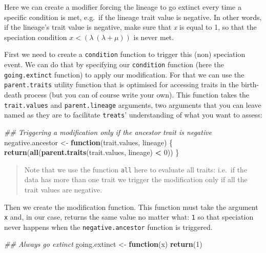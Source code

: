 \documentclass[
]{book}
\newenvironment{Shaded}{\begin{snugshade}}{\end{snugshade}}
\newcommand{\CommentTok}[1]{\textcolor[rgb]{0.56,0.35,0.01}{\textit{#1}}}
\newcommand{\ControlFlowTok}[1]{\textcolor[rgb]{0.13,0.29,0.53}{\textbf{#1}}}
\newcommand{\DecValTok}[1]{\textcolor[rgb]{0.00,0.00,0.81}{#1}}
\newcommand{\KeywordTok}[1]{\textcolor[rgb]{0.13,0.29,0.53}{\textbf{#1}}}
\newcommand{\NormalTok}[1]{#1}
\newcommand{\OperatorTok}[1]{\textcolor[rgb]{0.81,0.36,0.00}{\textbf{#1}}}
\newcommand{\StringTok}[1]{\textcolor[rgb]{0.31,0.60,0.02}{#1}}
\begin{document}
Here we can create a modifier forcing the lineage to go extinct every time a specific condition is met, e.g.~if the lineage trait value is negative.
In other words, if the lineage's trait value is negative, make sure that \emph{x} is equal to 1, so that the speciation condition \(x < (\lambda \ (\lambda + \mu))\) is never met.

First we need to create a \texttt{condition} function to trigger this (non) speciation event.
We can do that by specifying our \texttt{condition} function (here the \texttt{going.extinct} function) to apply our modification.
For that we can use the \texttt{parent.traits} utility function that is optimised for accessing traits in the birth-death process (but you can of course write your own).
This function takes the \texttt{trait.values} and \texttt{parent.lineage} arguments, two arguments that you can leave named as they are to facilitate \texttt{treats}' understanding of what you want to assess:

\begin{Shaded}
\begin{Highlighting}[]
\CommentTok{\#\# Triggering a modification only if the ancestor trait is negative}
\NormalTok{negative.ancestor \textless{}{-}}\StringTok{ }\ControlFlowTok{function}\NormalTok{(trait.values, lineage) \{}
    \KeywordTok{return}\NormalTok{(}\KeywordTok{all}\NormalTok{(}\KeywordTok{parent.traits}\NormalTok{(trait.values, lineage) }\OperatorTok{\textless{}}\StringTok{ }\DecValTok{0}\NormalTok{))}
\NormalTok{\}}
\end{Highlighting}
\end{Shaded}

\begin{quote}
Note that we use the function \texttt{all} here to evaluate all traits: i.e.~if the data has more than one trait we trigger the modification only if all the trait values are negative.
\end{quote}

Then we create the modification function.
This function must take the argument \texttt{x} and, in our case, returns the same value no matter what: \texttt{1} so that speciation never happens when the \texttt{negative.ancestor} function is triggered.

\begin{Shaded}
\begin{Highlighting}[]
\CommentTok{\#\# Always go extinct}
\NormalTok{going.extinct \textless{}{-}}\StringTok{ }\ControlFlowTok{function}\NormalTok{(x) }\KeywordTok{return}\NormalTok{(}\DecValTok{1}\NormalTok{)}
\end{Highlighting}
\end{Shaded}
\end{document}
